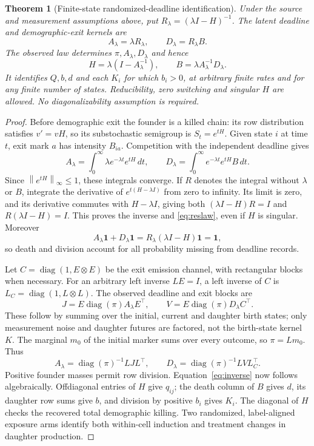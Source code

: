 \documentclass[11pt]{article}
\newtheorem{theorem}{Theorem}[section]
\theoremstyle{definition}
\newcommand{\one}{\mathbf 1}
\newcommand{\diag}{\operatorname{diag}}
\newcommand{\norm}[1]{\left\lVert#1\right\rVert_\infty}
\begin{document}
\begin{theorem}[Finite-state randomized-deadline identification]\label{thm:resolvent}
Under the source and measurement assumptions above, put
$R_\lambda=(\lambda I-H)^{-1}$. The latent deadline and demographic-exit kernels
are
\begin{equation}\label{eq:reslaw}
 A_\lambda=\lambda R_\lambda,\qquad D_\lambda=R_\lambda B.
\end{equation}
The observed law determines $\pi,A_\lambda,D_\lambda$ and hence
\begin{equation}\label{eq:inverse}
 H=\lambda(I-A_\lambda^{-1}),\qquad B=\lambda A_\lambda^{-1}D_\lambda.
\end{equation}
It identifies $Q,b,d$ and each $K_i$ for which $b_i>0$, at arbitrary finite
rates and for any finite number of states. Reducibility, zero switching and
singular $H$ are allowed. No diagonalizability assumption is required.
\end{theorem}
\begin{proof}
Before demographic exit the founder is a killed chain: its row distribution
satisfies $v'=vH$, so its substochastic semigroup is $S_t=e^{tH}$. Given state
$i$ at time $t$, exit mark $a$ has intensity $B_{ia}$. Competition with the
independent deadline gives
\[
 A_\lambda=\int_0^\infty\lambda e^{-\lambda t}e^{tH}\,dt,
 \qquad D_\lambda=\int_0^\infty e^{-\lambda t}e^{tH}B\,dt.
\]
Since $\norm{e^{tH}}\le1$, these integrals converge. If $R$ denotes the integral
without $\lambda$ or $B$, integrate the derivative of $e^{t(H-\lambda I)}$ from
zero to infinity. Its limit is zero, and its derivative commutes with
$H-\lambda I$, giving both $(\lambda I-H)R=I$ and $R(\lambda I-H)=I$. This
proves the inverse and \eqref{eq:reslaw}, even if $H$ is singular. Moreover
\[
 A_\lambda\one+D_\lambda\one=R_\lambda(\lambda I-H)\one=\one,
\]
so death and division account for all probability missing from deadline records.

Let $C=\diag(1,E\otimes E)$ be the exit emission channel, with rectangular
blocks when necessary. For an arbitrary left inverse $LE=I$, a left inverse of
$C$ is $L_C=\diag(1,L\otimes L)$. The observed deadline and exit blocks are
\begin{equation}\label{eq:observed}
 J=E\diag(\pi)A_\lambda E^\top,\qquad V=E\diag(\pi)D_\lambda C^\top.
\end{equation}
These follow by summing over the initial, current and daughter birth states;
only measurement noise and daughter futures are factored, not the birth-state
kernel $K$. The marginal $m_0$ of the initial marker sums over every outcome, so
$\pi=Lm_0$. Thus
\[
 A_\lambda=\diag(\pi)^{-1}LJL^\top,\qquad
 D_\lambda=\diag(\pi)^{-1}LVL_C^\top.
\]
Positive founder masses permit row division. Equation~\eqref{eq:inverse} now
follows algebraically. Offdiagonal entries of $H$ give $q_{ij}$; the death column
of $B$ gives $d$, its daughter row sums give $b$, and division by positive $b_i$
gives $K_i$. The diagonal of $H$ checks the recovered total demographic killing.
Two randomized, label-aligned exposure arms identify both within-cell induction
and treatment changes in daughter production.
\end{proof}
\end{document}
